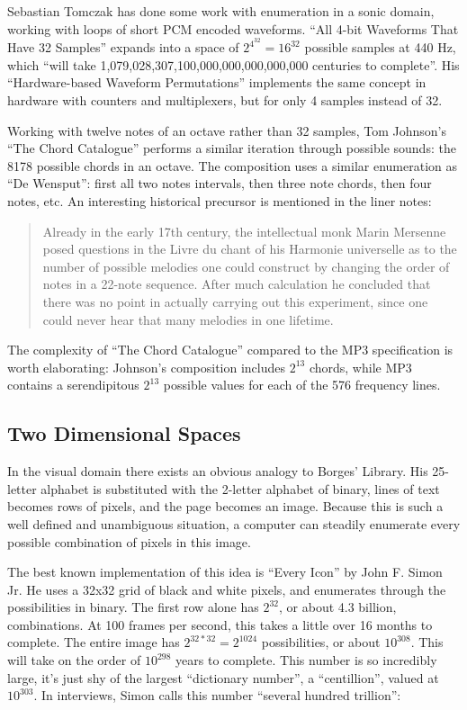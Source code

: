 \documentclass{thesis}
\begin{document}
	Sebastian Tomczak has done some work with enumeration in a sonic domain, working with loops of short PCM encoded waveforms. ``All 4-bit Waveforms That Have 32 Samples''\cite{tomczak_all_2009} expands into a space of $2^{4^{32}}=16^{32}$ possible samples at 440 Hz, which ``will take 1,079,028,307,100,000,000,000,000,000 centuries to complete''. His ``Hardware-based Waveform Permutations''\cite{tomczak_hardware-based_2009} implements the same concept in hardware with counters and multiplexers, but for only 4 samples instead of 32.
	
	Working with twelve notes of an octave rather than 32 samples, Tom Johnson's ``The Chord Catalogue''\cite{tom_johnson_liner_1999} performs a similar iteration through possible sounds: the 8178 possible chords in an octave. The composition uses a similar enumeration as ``De Wensput'': first all two notes intervals, then three note chords, then four notes, etc. An interesting historical precursor is mentioned in the liner notes:
	
	\begin{quote}
	Already in the early 17th century, the intellectual monk Marin Mersenne posed questions in the Livre du chant of his Harmonie universelle as to the number of possible melodies one could construct by changing the order of notes in a 22-note sequence. After much calculation he concluded that there was no point in actually carrying out this experiment, since one could never hear that many melodies in one lifetime.
	\end{quote}
	
	The complexity of ``The Chord Catalogue'' compared to the MP3 specification is worth elaborating: Johnson's composition includes $2^13$ chords, while MP3 contains a serendipitous $2^13$ possible values for each of the 576 frequency lines.

\subsection{Two Dimensional Spaces}

	In the visual domain there exists an obvious analogy to Borges' Library. His 25-letter alphabet is substituted with the 2-letter alphabet of binary, lines of text becomes rows of pixels, and the page becomes an image. Because this is such a well defined and unambiguous situation, a computer can steadily enumerate every possible combination of pixels in this image.
	
	The best known implementation of this idea is ``Every Icon'' by John F. Simon Jr.\cite{john_f._simon_jr._every_????} He uses a 32x32 grid of black and white pixels, and enumerates through the possibilities in binary. The first row alone has $2^{32}$, or about 4.3 billion, combinations. At 100 frames per second, this takes a little over 16 months to complete. The entire image has $2^{32*32}=2^{1024}$ possibilities, or about $10^{308}$. This will take on the order of $10^{298}$ years to complete. This number is so incredibly large, it's just shy of the largest ``dictionary number'', a ``centillion'', valued at $10^{303}$. In interviews, Simon calls this number ``several hundred trillion''\cite{matthew_mirapaul_in_1997}:
	
\end{document}
